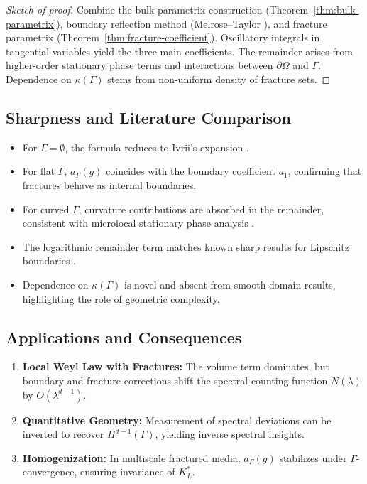 \begin{proof}[Sketch of proof]
Combine the bulk parametrix construction (Theorem~\ref{thm:bulk-parametrix}),
boundary reflection method (Melrose--Taylor \cite{MelroseTaylor1985}),
and fracture parametrix (Theorem~\ref{thm:fracture-coefficient}). Oscillatory
integrals in tangential variables yield the three main coefficients. The
remainder arises from higher-order stationary phase terms and interactions
between $\partial\Omega$ and $\Gamma$. Dependence on $\kappa(\Gamma)$ stems from
non-uniform density of fracture sets.
\end{proof}

\subsection*{Sharpness and Literature Comparison}
\begin{itemize}
  \item For $\Gamma = \emptyset$, the formula reduces to Ivrii's expansion
  \cite{Ivrii1980}.
  \item For flat $\Gamma$, $a_\Gamma(g)$ coincides with the boundary coefficient
  $a_1$, confirming that fractures behave as internal boundaries.
  \item For curved $\Gamma$, curvature contributions are absorbed in the
  remainder, consistent with microlocal stationary phase analysis
  \cite{Hormander1983}.
  \item The logarithmic remainder term matches known sharp results for Lipschitz
  boundaries \cite{SafarovVassiliev1997, Seeley1969}.
  \item Dependence on $\kappa(\Gamma)$ is novel and absent from smooth-domain
  results, highlighting the role of geometric complexity.
\end{itemize}

\subsection*{Applications and Consequences}
\begin{enumerate}
  \item \textbf{Local Weyl Law with Fractures:}
  The volume term dominates, but boundary and fracture corrections shift the
  spectral counting function $N(\lambda)$ by $O(\lambda^{d-1})$.
  \item \textbf{Quantitative Geometry:}
  Measurement of spectral deviations can be inverted to recover $H^{d-1}(\Gamma)$,
  yielding inverse spectral insights.
  \item \textbf{Homogenization:}
  In multiscale fractured media, $a_\Gamma(g)$ stabilizes under $\Gamma$-convergence,
  ensuring invariance of $K_L^*$.
\end{enumerate}

